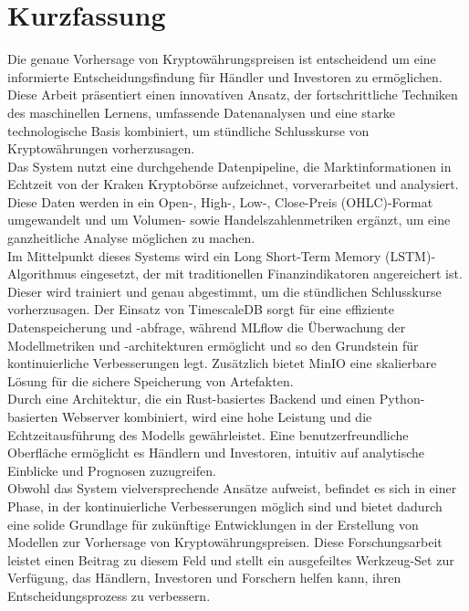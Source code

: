 \chapter{Kurzfassung}

Die genaue Vorhersage von Kryptowährungspreisen ist entscheidend um eine informierte Entscheidungsfindung für Händler und Investoren zu ermöglichen. Diese Arbeit präsentiert einen innovativen Ansatz, der fortschrittliche Techniken des maschinellen Lernens, umfassende Datenanalysen und eine starke technologische Basis kombiniert, um stündliche Schlusskurse von Kryptowährungen vorherzusagen. \\

Das System nutzt eine durchgehende Datenpipeline, die Marktinformationen in Echtzeit von der Kraken Kryptobörse aufzeichnet, vorverarbeitet und analysiert. Diese Daten werden in ein Open-, High-, Low-, Close-Preis (OHLC)-Format umgewandelt und um Volumen- sowie Handelszahlenmetriken ergänzt, um eine ganzheitliche Analyse möglichen zu machen. \\

Im Mittelpunkt dieses Systems wird ein Long Short-Term Memory (LSTM)-Algorithmus eingesetzt, der mit traditionellen Finanzindikatoren angereichert ist. Dieser wird trainiert und genau abgestimmt, um die stündlichen Schlusskurse vorherzusagen. Der Einsatz von TimescaleDB sorgt für eine effiziente Datenspeicherung und -abfrage, während MLflow die Überwachung der Modellmetriken und -architekturen ermöglicht und so den Grundstein für kontinuierliche Verbesserungen legt. Zusätzlich bietet MinIO eine skalierbare Lösung für die sichere Speicherung von Artefakten. \\

Durch eine Architektur, die ein Rust-basiertes Backend und einen Python-basierten Webserver kombiniert, wird eine hohe Leistung und die Echtzeitausführung des Modells gewährleistet. Eine benutzerfreundliche Oberfläche ermöglicht es Händlern und Investoren, intuitiv auf analytische Einblicke und Prognosen zuzugreifen. \\

Obwohl das System vielversprechende Ansätze aufweist, befindet es sich in einer Phase, in der kontinuierliche Verbesserungen möglich sind und bietet dadurch eine solide Grundlage für zukünftige Entwicklungen in der Erstellung von Modellen zur Vorhersage von Kryptowährungspreisen. Diese Forschungsarbeit leistet einen Beitrag zu diesem Feld und stellt ein ausgefeiltes Werkzeug-Set zur Verfügung, das Händlern, Investoren und Forschern helfen kann, ihren Entscheidungsprozess zu verbessern.